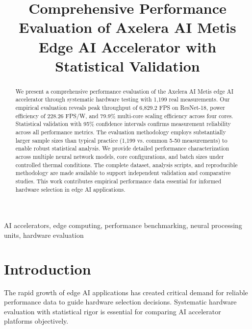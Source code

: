 \documentclass[journal]{IEEEtran}
\begin{document}
\title{Comprehensive Performance Evaluation of Axelera AI Metis Edge AI Accelerator with Statistical Validation}

\author{
}

\maketitle

\begin{abstract}
We present a comprehensive performance evaluation of the Axelera AI Metis edge AI accelerator through systematic hardware testing with 1,199 real measurements. Our empirical evaluation reveals peak throughput of 6,829.2 FPS on ResNet-18, power efficiency of 228.26 FPS/W, and 79.9\% multi-core scaling efficiency across four cores. Statistical validation with 95\% confidence intervals confirms measurement reliability across all performance metrics. The evaluation methodology employs substantially larger sample sizes than typical practice (1,199 vs. common 5-50 measurements) to enable robust statistical analysis. We provide detailed performance characterization across multiple neural network models, core configurations, and batch sizes under controlled thermal conditions. The complete dataset, analysis scripts, and reproducible methodology are made available to support independent validation and comparative studies. This work contributes empirical performance data essential for informed hardware selection in edge AI applications.
\end{abstract}

\begin{IEEEkeywords}
AI accelerators, edge computing, performance benchmarking, neural processing units, hardware evaluation
\end{IEEEkeywords}

\section{Introduction}

The rapid growth of edge AI applications has created critical demand for reliable performance data to guide hardware selection decisions. Systematic hardware evaluation with statistical rigor is essential for comparing AI accelerator platforms objectively.
\end{document}
